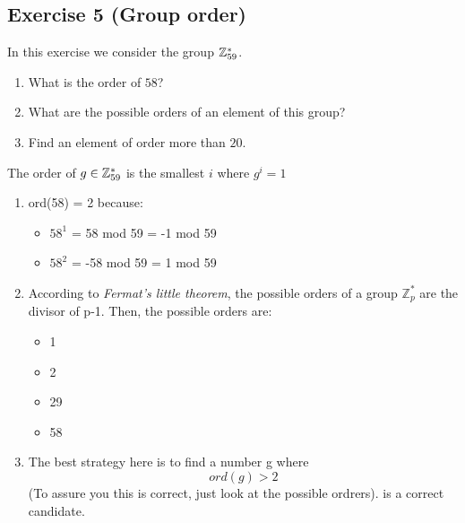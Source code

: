 \subsection{Exercise 5 (Group order)}

In this exercise we consider the group $\mathbb{Z}_{59}^*$.

\begin{enumerate}
	\item What is the order of $58$?
	\item What are the possible orders of an element of this group?
	\item Find an element of order more than $20$.
\end{enumerate}


\begin{solution}
	The order of $g \in \mathbb{Z}^*_{59}$ is the smallest $i$ where $g^i = 1$
	\begin{enumerate}
		\item ord(58) = 2 because:
		\begin{itemize}
			\item  $58^1$ = 58 mod 59 = -1 mod 59
			\item  $58^2$ = -58 mod 59 = 1 mod 59
		\end{itemize}
		\item According to \textit{Fermat's little theorem}, the possible orders of a group $\mathbb{Z}^*_{p}$ are the divisor of p-1. Then, the possible orders are:
		\begin{itemize}
			\item 1
			\item 2
			\item 29
			\item 58
		\end{itemize}
		\item The best strategy here is to find a number g where
		\[ ord(g) > 2 \]
		(To assure you this is correct, just look at the possible ordrers).   is a correct candidate.
	\end{enumerate}
\end{solution}

